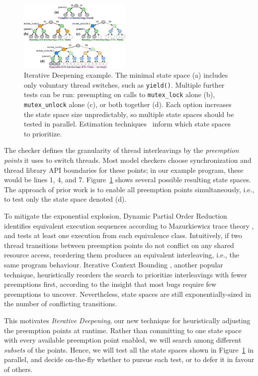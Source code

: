 \begin{figure}[t]
	\includegraphics[width=0.48\textwidth]{trees.pdf}
	\caption{Iterative Deepening example.
		The minimal state space (a) includes only voluntary thread switches, such as {\tt yield()}. %
		Multiple further tests can be run: preempting on calls to {\tt mutex\_lock} alone (b), {\tt mutex\_unlock} alone (c), or both together (d).
Each option increases the state space size unpredictably, so multiple state spaces should be tested in parallel.
Estimation techniques~\cite{estimation} inform which state spaces to prioritize.
}
	\label{fig:id}
\end{figure}

The checker defines the granularity of thread interleavings by the {\em preemption points} it uses to switch threads.
Most model checkers \cite{chess,dbug-ssv} choose synchronization and thread library API boundaries for these points;
in our example program, these would be lines 1, 4, and 7.
Figure~\ref{fig:id} shows several possible resulting state spaces.
The approach of prior work is to enable all preemption points simultaneously, i.e., to test only the state space denoted (d).

To mitigate the exponential explosion,
Dynamic Partial Order Reduction \cite{dpor} identifies equivalent execution sequences according to Mazurkiewicz trace theory \cite{mazurkiewicz},
and tests at least one execution from each equivalence class.
Intuitively, if two thread transitions between preemption points do not conflict on any shared resource access, reordering them produces an equivalent interleaving, i.e., the same program behaviour.
Iterative Context Bounding \cite{chess-icb}, another popular technique, heuristically reorders the search to prioritize interleavings with fewer preemptions first, according to the insight that most bugs require few preemptions to uncover.
Nevertheless, state spaces are still exponentially-sized in the number of conflicting transitions.

This motivates {\em Iterative Deepening}, our new technique for heuristically adjusting the preemption points at runtime.
Rather than committing to one state space with every available preemption point enabled,
we will search among different {\em subsets} of the points.
Hence, we will test all the state spaces shown in Figure~\ref{fig:id} in parallel,
and decide on-the-fly whether to pursue each test, or to defer it in favour of others.

